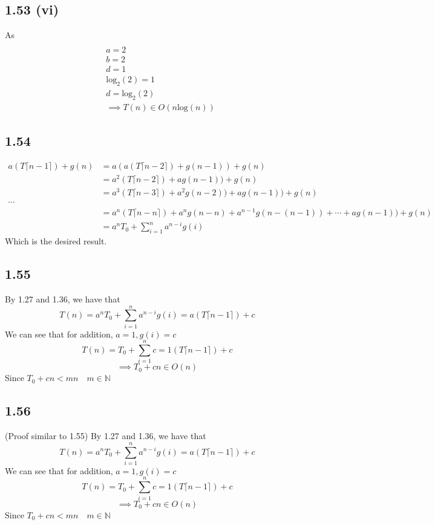 \documentclass[letterpaper,12pt]{article}
\theoremstyle{definition}
\begin{document}
\subsection*{1.53 (vi)}
As 
\begin{align*}
\\&a=2\\
&b=2\\
&d=1\\
&\text{log}_2 (2) = 1\\
&d = \text{log}_2 (2)\\
&\implies T(n) \in O(n \text{log} (n) )    
\end{align*}

\subsection*{1.54}
\begin{align*}
    a(T\lceil n-1 \rceil) + g(n) &=a(a(T\lceil n-2 \rceil) + g(n-1)) + g(n)
\\&=a^2(T\lceil n-2 \rceil) + ag(n-1)) + g(n)
\\&=a^3(T\lceil n-3 \rceil) + a^2g(n-2))+ ag(n-1)) + g(n)
\\\cdots
\\&=a^n(T\lceil n-n \rceil) + a^ng(n-n) + a^{n-1}g(n-(n-1)) + \cdots + ag(n-1)) + g(n)
\\&=a^nT_0 + \sum^{n}_{i=1} a^{n-i}g(i)
\end{align*}
Which is the desired result.

\subsection*{1.55}
By 1.27 and 1.36, we have that \[T(n) = a^nT_0 + \sum^{n}_{i=1} a^{n-i} g(i) = a(T\lceil n-1 \rceil) + c\]
We can see that for addition, $a=1, g(i) = c$
\[T(n) = T_0 + \sum^{n}_{i=1} c = 1(T\lceil n-1 \rceil) + c\]
\[\implies T_0 + cn \in O(n)\]
Since $T_0 + cn < mn \quad m \in \mathbb{N} $

\subsection*{1.56}
(Proof similar to 1.55) By 1.27 and 1.36, we have that \[T(n) = a^nT_0 + \sum^{n}_{i=1} a^{n-i} g(i) = a(T\lceil n-1 \rceil) + c\]
We can see that for addition, $a=1, g(i) = c$
\[T(n) = T_0 + \sum^{n}_{i=1} c = 1(T\lceil n-1 \rceil) + c\]
\[\implies T_0 + cn \in O(n)\]
Since $T_0 + cn < mn \quad m \in \mathbb{N} $
\end{document}

